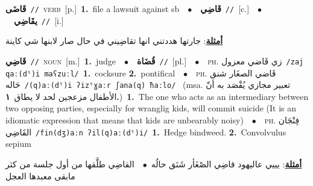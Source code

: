 \documentclass[10pt,a4paper,twoside]{article} %
\begin{document}
\begin{multicols}{2}
{\setlength\topsep{0pt}\textbf{\foreignlanguage{arabic}{قَاضَى}}\ {\color{gray}\texttt{//}\color{black}}\ \textsc{verb}\ [p.]\ \textbf{1.}~file a lawsuit against sb\ \ $\bullet$\ \ \setlength\topsep{0pt}\textbf{\foreignlanguage{arabic}{قَاضِي}}\ {\color{gray}\texttt{//}\color{black}}\ [c.]\ \ $\bullet$\ \ \setlength\topsep{0pt}\textbf{\foreignlanguage{arabic}{يقَاضِي}}\ {\color{gray}\texttt{//}\color{black}}\ [i.]\  \begin{flushright}\color{gray}\foreignlanguage{arabic}{\textbf{\underline{\foreignlanguage{arabic}{أمثلة}}}: جارتها هددتني انها تقاضِيني في حال صار لابنها شي كاينة}\end{flushright}\color{black}} \vspace{2mm}

{\setlength\topsep{0pt}\textbf{\foreignlanguage{arabic}{قَاضِي}}\ {\color{gray}\texttt{//}\color{black}}\ \textsc{noun}\ [m.]\ \textbf{1.}~judge\ \ $\bullet$\ \ \setlength\topsep{0pt}\textbf{\foreignlanguage{arabic}{قُضَاة}}\ {\color{gray}\texttt{//}\color{black}}\ [pl.]\ \ $\bullet$\ \ \textsc{ph.} \color{gray} \foreignlanguage{arabic}{زي قَاضي معزول}\color{black}\ {\color{gray}\texttt{/{\sffamily zaj qaː(dˤ)i maʕzuːl}/}\color{black}}\ \textbf{1.}~cocksure  \textbf{2.}~pontifical\ \ $\bullet$\ \ \textsc{ph.} \color{gray} \foreignlanguage{arabic}{قَاضي الصغَار شنق حَاله}\color{black}\ {\color{gray}\texttt{/{\sffamily (q)aː(dˤ)i ʔizˤɣaːr ʃana(q) ħaːlo}/}\color{black}}\ \color{gray} (msa. \foreignlanguage{arabic}{تعبير مجازي يُقْصَد به أنّ الأطفال مزعجين لحد لا يطاق}~\foreignlanguage{arabic}{\textbf{١.}})\color{black}\ \textbf{1.}~The one who acts as an intermediary between two opposing parties, especially for wranglig kids, will commit suicide (It is an idiomatic expression that means that kids are unbearably noisy)\ \ $\bullet$\ \ \textsc{ph.} \color{gray} \foreignlanguage{arabic}{فِنْجَان القَاضِي}\color{black}\ {\color{gray}\texttt{/{\sffamily fin(dʒ)aːn ʔil(q)aː(dˤ)i}/}\color{black}}\ \textbf{1.}~Hedge bindweed.  \textbf{2.}~Convolvulus sepium\  \begin{flushright}\color{gray}\foreignlanguage{arabic}{\textbf{\underline{\foreignlanguage{arabic}{أمثلة}}}: يييي عاليهود قاضِي الصْغَأر شَنَق حالُه\ $\bullet$\ \  القاضِي طلَّقها من أول جلسة من كثر مابقى معبدها العجل}\end{flushright}\color{black}} \vspace{2mm}


\end{multicols}
\end{document}
